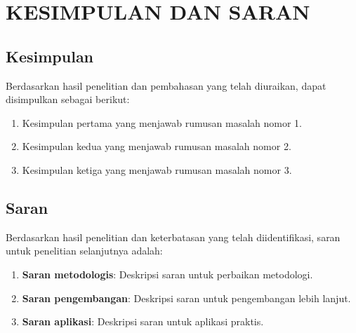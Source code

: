 \chapter{KESIMPULAN DAN SARAN}
\label{bab:kesimpulan}

\section{Kesimpulan}
\label{sec:kesimpulan}

Berdasarkan hasil penelitian dan pembahasan yang telah diuraikan, dapat disimpulkan sebagai berikut:

\begin{enumerate}
    \item Kesimpulan pertama yang menjawab rumusan masalah nomor 1.
    \item Kesimpulan kedua yang menjawab rumusan masalah nomor 2.
    \item Kesimpulan ketiga yang menjawab rumusan masalah nomor 3.
\end{enumerate}

\section{Saran}
\label{sec:saran}

Berdasarkan hasil penelitian dan keterbatasan yang telah diidentifikasi, saran untuk penelitian selanjutnya adalah:

\begin{enumerate}
    \item \textbf{Saran metodologis}: Deskripsi saran untuk perbaikan metodologi.
    \item \textbf{Saran pengembangan}: Deskripsi saran untuk pengembangan lebih lanjut.
    \item \textbf{Saran aplikasi}: Deskripsi saran untuk aplikasi praktis.
\end{enumerate}